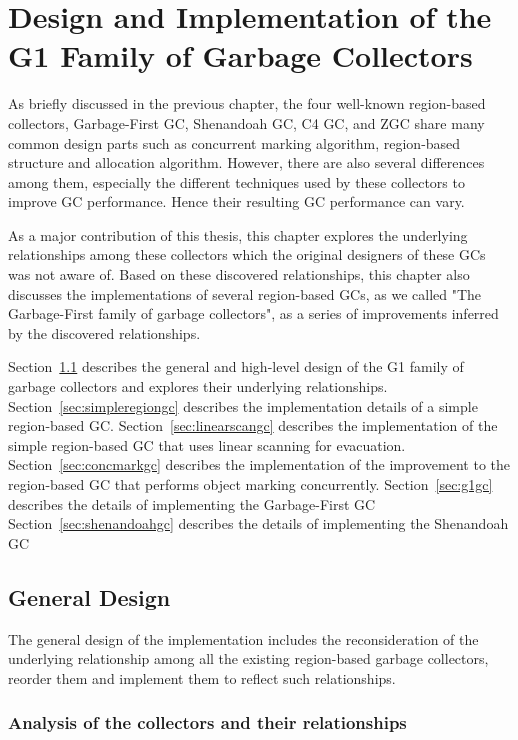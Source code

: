 \chapter{Design and Implementation of the G1 Family of Garbage Collectors}
\label{cha:implementation}

As briefly discussed in the previous chapter, the four well-known region-based collectors, Garbage-First GC, Shenandoah GC, C4 GC, and
ZGC share many common design parts such as concurrent marking algorithm, region-based
structure and allocation algorithm. However, there are also several differences
among them, especially the different techniques used by these collectors to improve GC performance.
Hence their resulting GC performance can vary.

As a major contribution of this thesis, this chapter explores the underlying relationships
among these collectors which the original designers of these GCs was not aware of.
Based on these discovered relationships, this chapter also discusses the implementations
of several region-based GCs, as we called "The Garbage-First family of garbage collectors",
as a series of improvements inferred by the discovered relationships.

Section~\ref{sec:generaldesign} describes the general and high-level design of the
G1 family of garbage collectors and explores their underlying relationships.
Section~\ref{sec:simpleregiongc} describes the implementation details of a simple region-based GC.
Section~\ref{sec:linearscangc} describes the implementation of the simple region-based GC that uses linear scanning for evacuation.
Section~\ref{sec:concmarkgc} describes the implementation of the improvement to the region-based GC that performs object marking concurrently.
Section~\ref{sec:g1gc} describes the details of implementing the Garbage-First GC
Section~\ref{sec:shenandoahgc} describes the details of implementing the Shenandoah GC



\section{General Design}
\label{sec:generaldesign}

The general design of the implementation includes the reconsideration of the underlying
relationship among all the existing region-based garbage collectors, reorder them
and implement them to reflect such relationships.

\subsection{Analysis of the collectors and their relationships}

